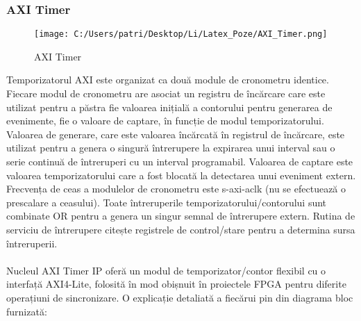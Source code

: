 \documentclass[12pt]{article}
\begin{document}
\subsubsection{AXI Timer} 

\begin{figure}[H]
    \centering
    \texttt{[image: C:/Users/patri/Desktop/Li/Latex\_Poze/AXI\_Timer.png]}
    \caption{AXI Timer}
\end{figure}

\hspace*{1cm}Temporizatorul AXI este organizat ca două module de cronometru identice. Fiecare modul de cronometru are asociat un registru de încărcare care este utilizat pentru a păstra fie valoarea inițială a contorului pentru generarea de evenimente, fie o valoare de captare, în funcție de modul temporizatorului. Valoarea de generare, care este valoarea încărcată în registrul de încărcare, este utilizat pentru a genera o singură întrerupere la expirarea unui interval sau o serie continuă de întreruperi cu un interval programabil. Valoarea de captare este valoarea temporizatorului care a fost blocată la detectarea unui eveniment extern. Frecvența de ceas a modulelor de cronometru este s-axi-aclk (nu se efectuează o prescalare a ceasului). Toate întreruperile temporizatorului/contorului sunt combinate OR pentru a genera un singur semnal de întrerupere extern. Rutina de serviciu de întrerupere citește registrele de control/stare pentru a determina sursa întreruperii.\\\\
\hspace*{1cm}Nucleul AXI Timer IP oferă un modul de temporizator/contor flexibil cu o interfață AXI4-Lite, folosită în mod obișnuit în proiectele FPGA pentru diferite operațiuni de sincronizare. O explicație detaliată a fiecărui pin din diagrama bloc furnizată:
\end{document}
